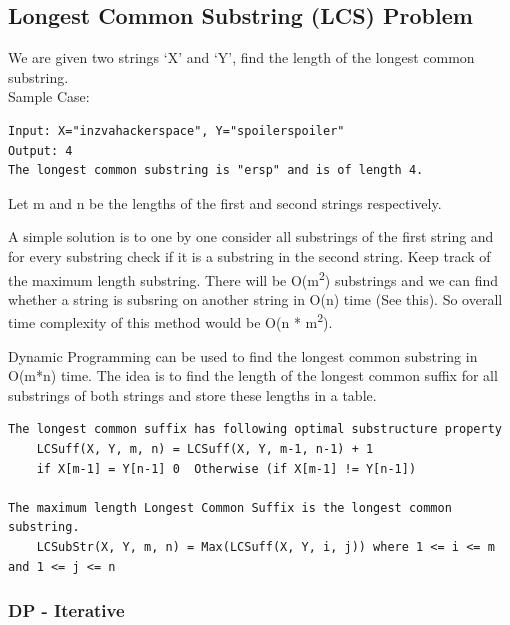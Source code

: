 \documentclass[12pt]{article}
\begin{document}
	\subsection{Longest Common Substring (LCS) Problem}
	We are given two strings ‘X’ and ‘Y’, find the length of the longest common substring.\\
	Sample Case:
	\begin{lstlisting}[numbers=none, frame=none]
Input: X="inzvahackerspace", Y="spoilerspoiler"
Output: 4
The longest common substring is "ersp" and is of length 4.
	\end{lstlisting}
	
	Let m and n be the lengths of the first and second strings respectively.

    A simple solution is to one by one consider all substrings of the first string and for every substring check if it is a substring in the second string. Keep track of the maximum length substring. There will be O(m\textsuperscript{2}) substrings and we can find whether a string is subsring on another string in O(n) time (See this). So overall time complexity of this method would be O(n * m\textsuperscript{2}).

    Dynamic Programming can be used to find the longest common substring in O(m*n) time. The idea is to find the length of the longest common suffix for all substrings of both strings and store these lengths in a table.
	
	\begin{lstlisting}[numbers=none, frame=none]
The longest common suffix has following optimal substructure property
    LCSuff(X, Y, m, n) = LCSuff(X, Y, m-1, n-1) + 1
    if X[m-1] = Y[n-1] 0  Otherwise (if X[m-1] != Y[n-1])

The maximum length Longest Common Suffix is the longest common substring.
    LCSubStr(X, Y, m, n) = Max(LCSuff(X, Y, i, j)) where 1 <= i <= m and 1 <= j <= n
	\end{lstlisting}
	\newpage
	\subsubsection{DP - Iterative}
	
\end{document}

